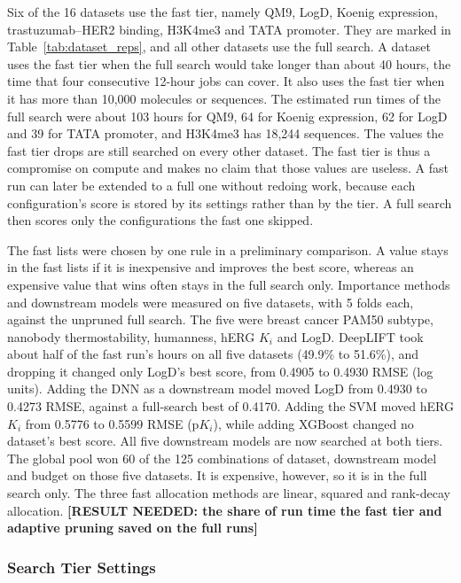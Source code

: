 Six of the 16 datasets use the fast tier, namely QM9, LogD, Koenig expression, trastuzumab--HER2 binding, H3K4me3 and TATA promoter. They are marked in Table~\ref{tab:dataset_reps}, and all other datasets use the full search. A dataset uses the fast tier when the full search would take longer than about 40 hours, the time that four consecutive 12-hour jobs can cover. It also uses the fast tier when it has more than 10,000 molecules or sequences. The estimated run times of the full search were about 103 hours for QM9, 64 for Koenig expression, 62 for LogD and 39 for TATA promoter, and H3K4me3 has 18,244 sequences. The values the fast tier drops are still searched on every other dataset. The fast tier is thus a compromise on compute and makes no claim that those values are useless. A fast run can later be extended to a full one without redoing work, because each configuration's score is stored by its settings rather than by the tier. A full search then scores only the configurations the fast one skipped.

The fast lists were chosen by one rule in a preliminary comparison. A value stays in the fast lists if it is inexpensive and improves the best score, whereas an expensive value that wins often stays in the full search only. Importance methods and downstream models were measured on five datasets, with 5 folds each, against the unpruned full search. The five were breast cancer PAM50 subtype, nanobody thermostability, humanness, hERG $K_i$ and LogD. DeepLIFT took about half of the fast run's hours on all five datasets (49.9\% to 51.6\%), and dropping it changed only LogD's best score, from 0.4905 to 0.4930 RMSE (log units). Adding the DNN as a downstream model moved LogD from 0.4930 to 0.4273 RMSE, against a full-search best of 0.4170. Adding the SVM moved hERG $K_i$ from 0.5776 to 0.5599 RMSE (p$K_i$), while adding XGBoost changed no dataset's best score. All five downstream models are now searched at both tiers. The global pool won 60 of the 125 combinations of dataset, downstream model and budget on those five datasets. It is expensive, however, so it is in the full search only. The three fast allocation methods are linear, squared and rank-decay allocation. \textbf{[RESULT NEEDED: the share of run time the fast tier and adaptive pruning saved on the full runs]}

\subsubsection{Search Tier Settings}

